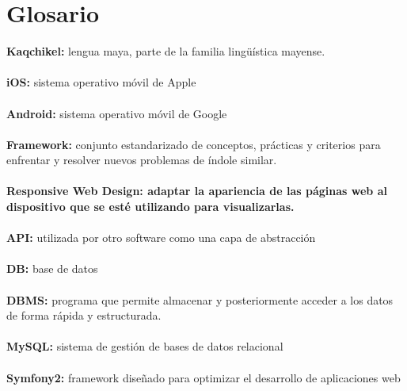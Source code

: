 \documentclass[a4paper,openright,11pt]{article}
\begin{document}
\section{Glosario}
\noindent \textbf{Kaqchikel: } lengua maya, parte de la familia lingüística mayense. \\\\
\textbf{iOS: } sistema operativo móvil de Apple \\\\
\textbf{Android: } sistema operativo móvil de Google \\\\
\textbf{Framework: } conjunto estandarizado de conceptos, prácticas y criterios para enfrentar y resolver nuevos problemas de índole similar. \\\\
\textbf{Responsive Web Design:  adaptar la apariencia de las páginas web al dispositivo que se esté utilizando para visualizarlas. }  \\\\
\textbf{API:  } utilizada por otro software como una capa de abstracción \\\\
\textbf{DB: } base de datos \\\\
\textbf{DBMS: } programa que permite almacenar y posteriormente acceder a los datos de forma rápida y estructurada.\\\\
\textbf{MySQL: }  sistema de gestión de bases de datos relacional \\\\
\textbf{Symfony2: } framework diseñado para optimizar el desarrollo de aplicaciones web\\ \\
\newpage

\pagestyle{fancy}
\end{document}
